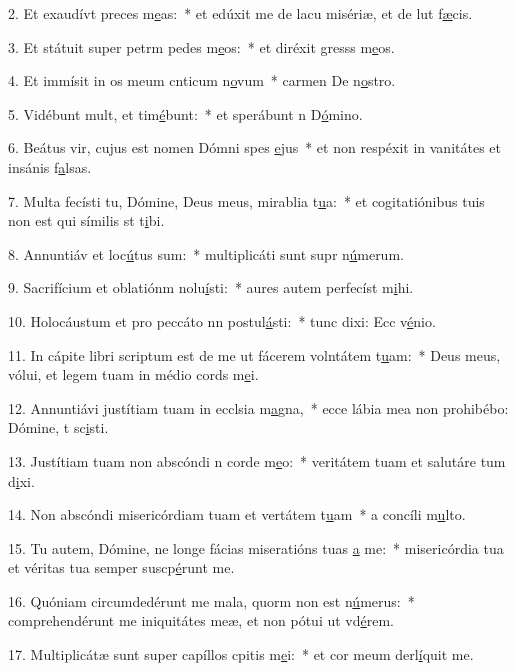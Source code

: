 2. Et exaudívt preces m\uline{e}as:~* et edúxit me de lacu misériæ, et de lut f\uline{æ}cis.\par 
3. Et státuit super petrm pedes m\uline{e}os:~* et diréxit gresss m\uline{e}os.\par 
4. Et immísit in os meum cnticum n\uline{o}vum~* carmen De n\uline{o}stro.\par 
5. Vidébunt mult, et tim\uline{é}bunt:~* et sperábunt n D\uline{ó}mino.\par 
6. Beátus vir, cujus est nomen Dómni spes \uline{e}jus~* et non respéxit in vanitátes et insánis f\uline{a}lsas.\par 
7. Multa fecísti tu, Dómine, Deus meus, mirablia t\uline{u}a:~* et cogitatiónibus tuis non est qui símilis st t\uline{i}bi.\par 
8. Annuntiáv et loc\uline{ú}tus sum:~* multiplicáti sunt supr n\uline{ú}merum.\par 
9. Sacrifícium et oblatiónm nolu\uline{í}sti:~* aures autem perfecíst m\uline{i}hi.\par 
10. Holocáustum et pro peccáto nn postul\uline{á}sti:~* tunc dixi: Ecc v\uline{é}nio.\par 
11. In cápite libri scriptum est de me ut fácerem volntátem t\uline{u}am:~* Deus meus, vólui, et legem tuam in médio cords m\uline{e}i.\par 
12. Annuntiávi justítiam tuam in ecclsia m\uline{a}gna,~* ecce lábia mea non prohibébo: Dómine, t sc\uline{i}sti.\par 
13. Justítiam tuam non abscóndi n corde m\uline{e}o:~* veritátem tuam et salutáre tum d\uline{i}xi.\par 
14. Non abscóndi misericórdiam tuam et vertátem t\uline{u}am~* a concíli m\uline{u}lto.\par 
15. Tu autem, Dómine, ne longe fácias miseratións tuas \uline{a} me:~* misericórdia tua et véritas tua semper suscp\uline{é}runt me.\par 
16. Quóniam circumdedérunt me mala, quorm non est n\uline{ú}merus:~* comprehendérunt me iniquitátes meæ, et non pótui ut vd\uline{é}rem.\par 
17. Multiplicátæ sunt super capíllos cpitis m\uline{e}i:~* et cor meum derl\uline{í}quit me.\par 
